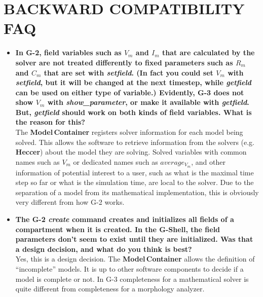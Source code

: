 \documentclass[12pt]{article}
\begin{document}
\section*{BACKWARD COMPATIBILITY FAQ}

\begin{itemize}

\item {\bf  In G-2, field variables such as $V_m$ and $I_m$ that are calculated by the solver are not treated differently to fixed parameters such as $R_m$ and $C_m$ that are set with {\it setfield}.  (In fact you could set $V_m$ with {\it setfield}, but it will be changed at the next timestep, while {\it getfield} can be used on either type of variable.)  Evidently, G-3 does not show $V_m$ with {\it show\_parameter}, or make it available with {\it getfield}.  But, {\it getfield} should work on both kinds of field variables. What is the reason for this?} \\
The {\bf Model\,Container} registers solver information for each model being solved.  This allows the software to retrieve information from the solvers (e.g. {\bf Heccer}) about the model they are solving. Solved variables with common names such as $V_m$ or dedicated names such as $average_{V_m}$, and other information of potential interest to a user, such as what is the maximal time step so far or what is the simulation time, are local to the solver. Due to the separation of a model from its mathematical implementation, this is obviously very different from how G-2 works.

\item {\bf The G-2 {\it create} command creates and initializes all fields of a compartment when it is created.  In the {\bf G-Shell}, the field parameters don't seem to exist until they are initialized. Was that a design decision, and what do you think is best?} \\
Yes, this is a design decision.  The {\bf Model\,Container} allows the definition of
``incomplete'' models.  It is up to other software components to decide if a model is complete or not. In G-3 completeness for a mathematical solver
is quite different from completeness for a morphology analyzer.


\end{itemize}
\end{document}
